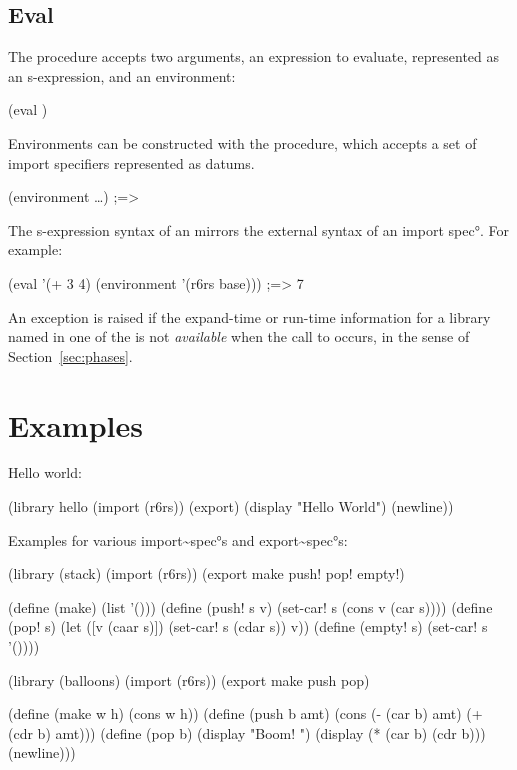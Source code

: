 \documentclass{monograph}
\begin{document}
\subsection{Eval\label{sec:eval}}

The  procedure accepts two arguments, an expression to
evaluate, represented as an s-expression, and an environment:

\schemedisplay
(eval  )
\endschemedisplay

Environments can be constructed with the  procedure,
which accepts a set of import specifiers represented as datums.

\schemedisplay
(environment  \dots) ;=> 
\endschemedisplay

The s-expression syntax of an  mirrors the external
syntax of an \ang{import spec}.
For example:

\schemedisplay
(eval '(+ 3 4) (environment '(r6rs base))) ;=> 7
\endschemedisplay

An exception is raised if the expand-time or run-time information for a
library named in one of the  is not \emph{available}
when the call to  occurs, in the sense of
Section~\ref{sec:phases}.

\section{Examples}


Hello world:

\schemedisplay
(library hello
  (import (r6rs))
  (export)
  (display "Hello World")
  (newline))
\endschemedisplay

Examples for various \ang{import~spec}s and \ang{export~spec}s:

\schemedisplay
(library (stack)
  (import (r6rs))
  (export make push! pop! empty!)

  (define (make) (list '()))
  (define (push! s v) (set-car! s (cons v (car s))))
  (define (pop! s) (let ([v (caar s)])
                     (set-car! s (cdar s))
                     v))
  (define (empty! s) (set-car! s '())))

(library (balloons)
  (import (r6rs))
  (export make push pop)

  (define (make w h) (cons w h))
  (define (push b amt) (cons (- (car b) amt) (+ (cdr b) amt)))
  (define (pop b) (display "Boom! ") 
                  (display (* (car b) (cdr b))) 
                  (newline)))
\end{document}
